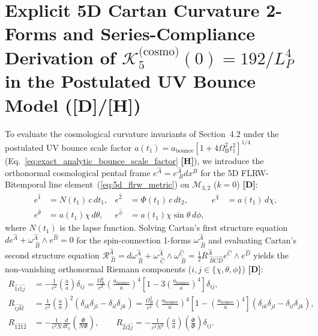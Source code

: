 \documentclass[11pt,a4paper]{article}
\newcommand{\catD}{\textbf{\textcolor{blue!75!black}{[D]}}}
\newcommand{\catH}{\textbf{\textcolor{orange!85!black}{[H]}}}
\theoremstyle{plain}
\theoremstyle{definition}
\theoremstyle{remark}
\numberwithin{equation}{section}
\begin{document}
\appendix

\section{\texorpdfstring{Explicit 5D Cartan Curvature 2-Forms and Series-Compliance Derivation of $\mathcal{K}_5^{\text{(cosmo)}}(0) = 192 / L_P^4$ in the Postulated UV Bounce Model (\catD/\catH)}{Explicit 5D Cartan Curvature 2-Forms and Series-Compliance Derivation of K_5(0) = 192 / L_P^4 in the Postulated UV Bounce Model}}
\label{app:cartan_curvature_bounce}

To evaluate the cosmological curvature invariants of Section~4.2 under the postulated UV bounce scale factor $a(t_1) = a_{\text{bounce}}[1 + 4\Omega_{\text{B}}^2 t_1^2]^{1/4}$ (Eq.~\ref{eq:exact_analytic_bounce_scale_factor} \catH), we introduce the orthonormal cosmological pentad frame $e^{\hat{A}} = e^{\hat{A}}_{\;B} dx^B$ for the 5D FLRW-Bitemporal line element~(\ref{eq:5d_flrw_metric}) on $\mathcal{M}_{3,2}$ ($k = 0$) \catD:
\begin{align}
e^{\hat{1}} &= N(t_1)\,c\,dt_1, & e^{\hat{2}} &= \Phi(t_1)\,c\,dt_2, & e^{\hat{\chi}} &= a(t_1)\,d\chi, \nonumber \\[3pt]
e^{\hat{\theta}} &= a(t_1)\chi\,d\theta, & e^{\hat{\phi}} &= a(t_1)\chi\sin\theta\,d\phi, & &
\label{eq:appendix_cosmo_pentad}
\end{align}
where $N(t_1)$ is the lapse function. Solving Cartan's first structure equation $de^{\hat{A}} + \omega^{\hat{A}}_{\;\hat{B}} \wedge e^{\hat{B}} = 0$ for the spin-connection 1-forms $\omega^{\hat{A}}_{\;\hat{B}}$ and evaluating Cartan's second structure equation $\mathcal{R}^{\hat{A}}_{\;\hat{B}} = d\omega^{\hat{A}}_{\;\hat{B}} + \omega^{\hat{A}}_{\;\hat{C}} \wedge \omega^{\hat{C}}_{\;\hat{B}} = \frac{1}{2} R^{\hat{A}}_{\;\hat{B}\hat{C}\hat{D}} e^{\hat{C}} \wedge e^{\hat{D}}$ yields the non-vanishing orthonormal Riemann components ($i,j \in \{\chi,\theta,\phi\}$) \catD:
\begin{align}
R_{\hat{1}\hat{i}\hat{1}\hat{j}} &= -\frac{1}{c^2}\left(\frac{\ddot{a}}{a}\right)\delta_{ij} = \frac{\Omega_{\text{B}}^2}{c^2} \left(\frac{a_{\text{bounce}}}{a}\right)^4 \left[ 1 - 3\left(\frac{a_{\text{bounce}}}{a}\right)^4 \right] \delta_{ij}, \label{eq:app_riemann_1i1j} \\[4pt]
R_{\hat{i}\hat{j}\hat{k}\hat{l}} &= \frac{1}{c^2}\left(\frac{\dot{a}}{a}\right)^2 \left(\delta_{ik}\delta_{jl} - \delta_{il}\delta_{jk}\right) = \frac{\Omega_{\text{B}}^2}{c^2}\left(\frac{a_{\text{bounce}}}{a}\right)^4 \left[ 1 - \left(\frac{a_{\text{bounce}}}{a}\right)^4 \right]\left(\delta_{ik}\delta_{jl} - \delta_{il}\delta_{jk}\right), \label{eq:app_riemann_ijkl} \\[4pt]
R_{\hat{1}\hat{2}\hat{1}\hat{2}} &= -\frac{1}{c^2 N}\frac{d}{dt_1}\left(\frac{\dot{\Phi}}{N\Phi}\right), \qquad R_{\hat{2}\hat{i}\hat{2}\hat{j}} = -\frac{1}{c^2 N^2}\left(\frac{\dot{a}}{a}\right)\left(\frac{\dot{\Phi}}{\Phi}\right)\delta_{ij}.
\label{eq:app_riemann_fiber}
\end{align}
\end{document}

